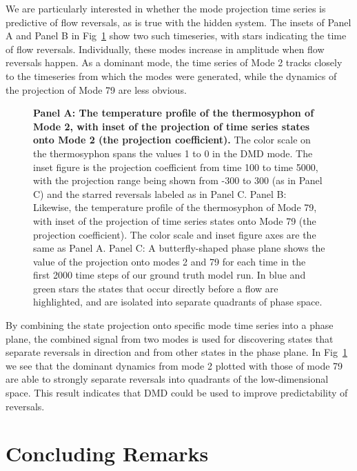 \documentclass[10pt,letterpaper]{article}
\begin{document}
We are particularly interested in whether the mode projection time series is predictive of flow reversals, as is true with the hidden system.
The insets of Panel A and Panel B in Fig~\ref{fig:DMD_phaseplane} show two such timeseries, with stars indicating the time of flow reversals.
Individually, these modes increase in amplitude when flow reversals happen.
As a dominant mode, the time series of Mode 2 tracks closely to the timeseries from which the modes were generated, while the dynamics of the projection of Mode 79 are less obvious.

\begin{figure}[h]
  \centering
  \caption[]{
\textbf{    Panel A: The temperature profile of the thermosyphon of Mode 2, with inset of the projection of time series states onto Mode 2 (the projection coefficient).
}    The color scale on the thermosyphon spans the values 1 to 0 in the DMD mode.
    The inset figure is the projection coefficient from time 100 to time 5000, with the projection range being shown from -300 to 300 (as in Panel C) and the starred reversals labeled as in Panel C.
    Panel B: Likewise, the temperature profile of the thermosyphon of Mode 79, with inset of the projection of time series states onto Mode 79 (the projection coefficient).
    The color scale and inset figure axes are the same as Panel A.
    Panel C: A butterfly-shaped phase plane shows the value of the projection onto modes 2 and 79 for each time in the first 2000 time steps of our ground truth model run.
    In blue and green stars the states that occur directly before a flow are highlighted, and are isolated into separate quadrants of phase space.
  }
  \label{fig:DMD_phaseplane}
\end{figure}

By combining the state projection onto specific mode time series into a phase plane, the combined signal from two modes is used for discovering states that separate reversals in direction and from other states in the phase plane.
In Fig~\ref{fig:DMD_phaseplane} we see that the dominant dynamics from mode 2 plotted with those of mode 79 are able to strongly separate reversals into quadrants of the low-dimensional space.
This result indicates that DMD could be used to improve predictability of reversals.

\section*{Concluding Remarks}
\end{document}
